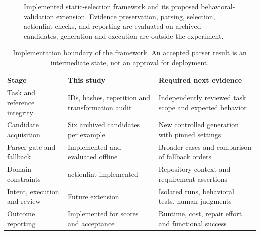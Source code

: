 \begin{figure}[H]
\centering
{}
\caption{Implemented static-selection framework and its proposed behavioral-validation extension. Evidence preservation, parsing, selection, actionlint checks, and reporting are evaluated on archived candidates; generation and execution are outside the experiment.}
\label{fig:framework}
\end{figure}

\begin{table}[H]
\centering\small
\caption{Implementation boundary of the framework. An accepted parser result is an intermediate state, not an approval for deployment.}
\label{tab:framework}
\begin{tabularx}{\linewidth}{@{}lYY@{}}
\toprule
Stage & This study & Required next evidence\\
\midrule
Task and reference integrity & IDs, hashes, repetition and transformation audit & Independently reviewed task scope and expected behavior\\
Candidate acquisition & Six archived candidates per example & New controlled generation with pinned settings\\
Parser gate and fallback & Implemented and evaluated offline & Broader cases and comparison of fallback orders\\
Domain constraints & actionlint implemented & Repository context and requirement assertions\\
Intent, execution and review & Future extension & Isolated runs, behavioral tests, human judgments\\
Outcome reporting & Implemented for scores and acceptance & Runtime, cost, repair effort and functional success\\
\bottomrule
\end{tabularx}
\end{table}

